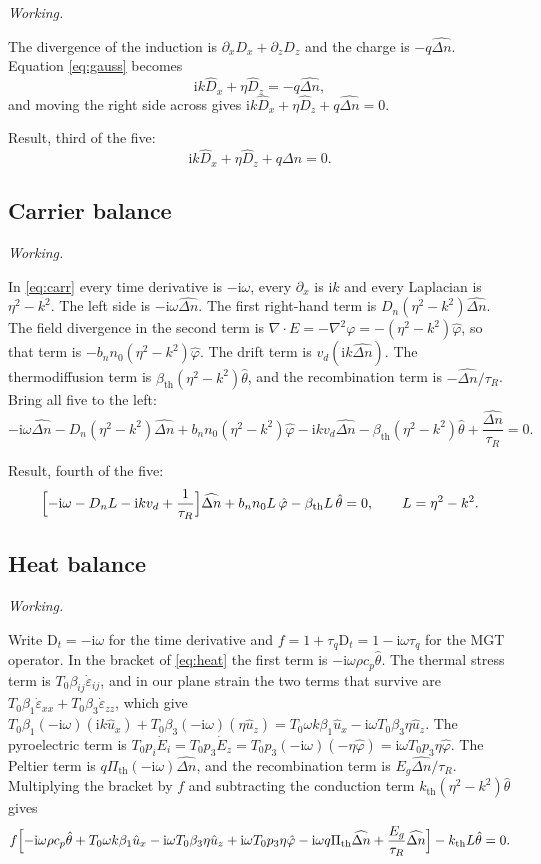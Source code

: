 \documentclass[11pt,a4paper]{article}
\newif\ifshowworked \showworkedtrue
\newenvironment{worked}{\ifshowworked\par\smallskip\noindent\textit{Working.}\par\else\setbox0\vbox\bgroup\fi}{\ifshowworked\par\smallskip\else\egroup\fi}
\newcommand{\eps}{\varepsilon}
\newcommand{\bth}{\beta_{\mathrm{th}}}
\newcommand{\Pth}{\Pi_{\mathrm{th}}}
\newcommand{\ii}{\mathrm{i}}
\newcommand{\bx}{\hat u_x}
\newcommand{\bz}{\hat u_z}
\newcommand{\bp}{\hat\varphi}
\newcommand{\bn}{\widehat{\Delta n}}
\newcommand{\bt}{\hat\theta}
\newcommand{\kB}{k_{\mathrm{th}}}
\begin{document}
\begin{worked}
The divergence of the induction is $\partial_xD_x+\partial_zD_z$ and the charge is $-q\bn$. Equation
\eqref{eq:gauss} becomes
\[
\ii k\hat D_x+\eta\hat D_z=-q\bn ,
\]
and moving the right side across gives $\ii k\hat D_x+\eta\hat D_z+q\bn=0$.
\end{worked}

\noindent Result, third of the five:
\begin{equation}\label{eq:g3}
\ii k\hat D_x+\eta\hat D_z+q\bn=0 .
\end{equation}

\subsection{Carrier balance}

\begin{worked}
In \eqref{eq:carr} every time derivative is $-\ii\omega$, every $\partial_x$ is $\ii k$ and every Laplacian
is $\eta^2-k^2$. The left side is $-\ii\omega\bn$. The first right-hand term is $D_n(\eta^2-k^2)\bn$. The
field divergence in the second term is $\nabla\cdot E=-\nabla^2\varphi=-(\eta^2-k^2)\bp$, so that term is
$-b_nn_0(\eta^2-k^2)\bp$. The drift term is $v_d(\ii k\bn)$. The thermodiffusion term is
$\bth(\eta^2-k^2)\bt$, and the recombination term is $-\bn/\tau_R$. Bring all five to the left:
\[
-\ii\omega\bn-D_n(\eta^2-k^2)\bn+b_nn_0(\eta^2-k^2)\bp-\ii k v_d\bn-\bth(\eta^2-k^2)\bt+\frac{\bn}{\tau_R}=0 .
\]
\end{worked}

\noindent Result, fourth of the five:
\begin{equation}\label{eq:g4}
\Bigl[-\ii\omega-D_nL-\ii kv_d+\frac{1}{\tau_R}\Bigr]\bn+b_nn_0L\,\bp-\bth L\,\bt=0,
\qquad L=\eta^2-k^2 .
\end{equation}

\subsection{Heat balance}

\begin{worked}
Write $\mathrm{D}_t=-\ii\omega$ for the time derivative and $f=1+\tau_q\mathrm{D}_t=1-\ii\omega\tau_q$ for
the MGT operator. In the bracket of \eqref{eq:heat} the first term is $-\ii\omega\rho c_p\bt$. The thermal
stress term is $T_0\beta_{ij}\dot\eps_{ij}$, and in our plane strain the two terms that survive are
$T_0\beta_1\dot\eps_{xx}+T_0\beta_3\dot\eps_{zz}$, which give
$T_0\beta_1(-\ii\omega)(\ii k\bx)+T_0\beta_3(-\ii\omega)(\eta\bz)=T_0\omega k\beta_1\bx-\ii\omega T_0\beta_3\eta\bz$.
The pyroelectric term is $T_0p_i\dot E_i=T_0p_3\dot E_z=T_0p_3(-\ii\omega)(-\eta\bp)=\ii\omega T_0p_3\eta\bp$.
The Peltier term is $q\Pth(-\ii\omega)\bn$, and the recombination term is $E_g\bn/\tau_R$. Multiplying the
bracket by $f$ and subtracting the conduction term $\kB(\eta^2-k^2)\bt$ gives
\[
f\Bigl[-\ii\omega\rho c_p\bt+T_0\omega k\beta_1\bx-\ii\omega T_0\beta_3\eta\bz
+\ii\omega T_0p_3\eta\bp-\ii\omega q\Pth\bn+\frac{E_g}{\tau_R}\bn\Bigr]-\kB L\bt=0 .
\]
\end{worked}
\end{document}
